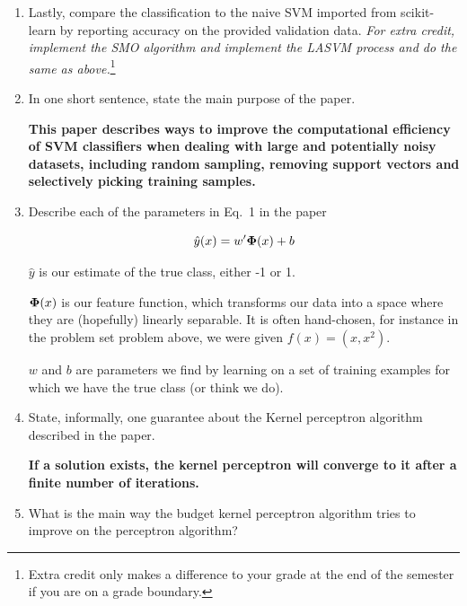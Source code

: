 \documentclass[submit]{harvardml}
\newenvironment{answer}{%
    \color{answergreen}\bf}
  {%
  }
\begin{document}
\begin{enumerate}
\begin{answer}
  \end{answer}
\item Lastly, compare the classification to the naive SVM imported from
scikit-learn by reporting accuracy on the provided validation
data. {\em For extra credit, implement the SMO algorithm and implement
  the LASVM process and do the same as above.}\footnote{Extra credit
  only makes a difference to your grade at the end of the semester if
  you are on a grade boundary.}


\item In one short sentence, state the main purpose of the paper.

    \begin{answer}
        This paper describes ways to improve the computational efficiency of SVM classifiers when
        dealing with large and potentially noisy datasets, including random sampling, removing
        support vectors and selectively picking training samples.
    \end{answer}
\item Describe each of the parameters in Eq.~1 in the paper

    \begin{answer}
        $$
        \hat{y}(x) = w'\mathbf{\Phi}(x) + b
        $$

        $\hat{y}$ is our estimate of the true class, either -1 or 1.

        $\mathbf{\Phi}(x)$ is our feature function, which transforms our data into a space where they are
        (hopefully) linearly separable. It is often hand-chosen, for instance in the problem set
        problem above, we were given $f(x) = (x, x^2)$.

        $w$ and $b$ are parameters we find by learning on a set of training examples for which we
        have the true class (or think we do).

    \end{answer}

\item State, informally, one guarantee about the Kernel perceptron algorithm described in the
  paper. 

    \begin{answer}
        If a solution exists, the kernel perceptron will converge to it after a finite number of
        iterations.
    \end{answer}

\item What is the main way the budget kernel perceptron algorithm tries to
  improve on the perceptron algorithm?


\end{enumerate}
\end{document}
